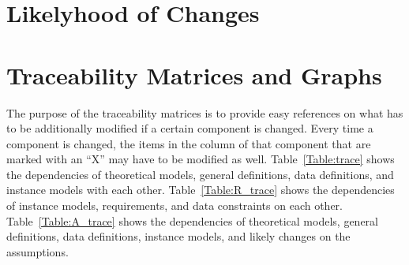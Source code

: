 \documentclass[12pt]{article}
\begin{document}
  
\clearpage
\section{Likelyhood of Changes}    


\section{Traceability Matrices and Graphs}

The purpose of the traceability matrices is to provide easy references on what
has to be additionally modified if a certain component is changed.  Every time a
component is changed, the items in the column of that component that are marked
with an ``X'' may have to be modified as well.  Table~\ref{Table:trace} shows the
dependencies of theoretical models, general definitions, data definitions, and
instance models with each other. Table~\ref{Table:R_trace} shows the
dependencies of instance models, requirements, and data constraints on each
other. Table~\ref{Table:A_trace} shows the dependencies of theoretical models,
general definitions, data definitions, instance models, and likely changes on
the assumptions.



\end{document}
